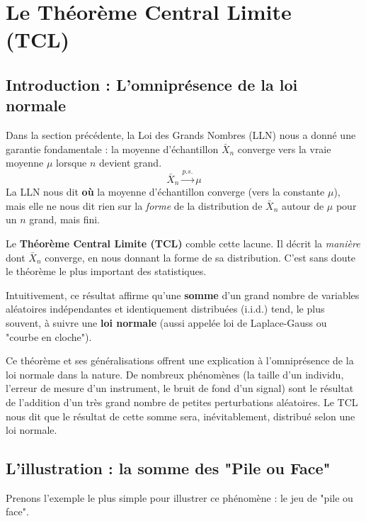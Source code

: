 \newpage

\section{Le Théorème Central Limite (TCL)}

\subsection{Introduction : L'omniprésence de la loi normale}

Dans la section précédente, la Loi des Grands Nombres (LLN) nous a donné une garantie fondamentale : la moyenne d'échantillon $\bar{X}_n$ converge vers la vraie moyenne $\mu$ lorsque $n$ devient grand.
$$ \bar{X}_n \xrightarrow{p.s.} \mu $$
La LLN nous dit \textbf{où} la moyenne d'échantillon converge (vers la constante $\mu$), mais elle ne nous dit rien sur la \textit{forme} de la distribution de $\bar{X}_n$ autour de $\mu$ pour un $n$ grand, mais fini.

Le \textbf{Théorème Central Limite (TCL)} comble cette lacune. Il décrit la \textit{manière} dont $\bar{X}_n$ converge, en nous donnant la forme de sa distribution. C'est sans doute le théorème le plus important des statistiques.

\begin{intuitionbox}
Intuitivement, ce résultat affirme qu'une \textbf{somme} d'un grand nombre de variables aléatoires indépendantes et identiquement distribuées (i.i.d.) tend, le plus souvent, à suivre une \textbf{loi normale} (aussi appelée loi de Laplace-Gauss ou "courbe en cloche").

Ce théorème et ses généralisations offrent une explication à l'omniprésence de la loi normale dans la nature. De nombreux phénomènes (la taille d'un individu, l'erreur de mesure d'un instrument, le bruit de fond d'un signal) sont le résultat de l'addition d'un très grand nombre de petites perturbations aléatoires. Le TCL nous dit que le résultat de cette somme sera, inévitablement, distribué selon une loi normale.
\end{intuitionbox}

\subsection{L'illustration : la somme des "Pile ou Face"}

Prenons l'exemple le plus simple pour illustrer ce phénomène : le jeu de "pile ou face".



